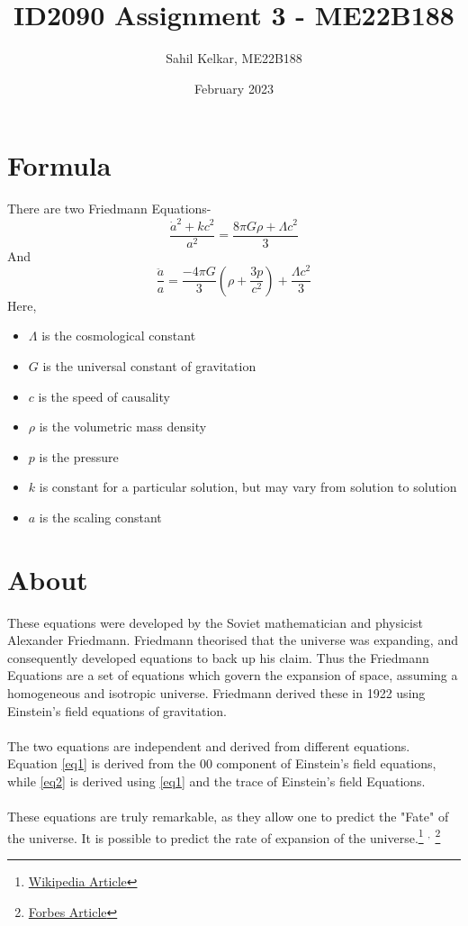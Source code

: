 \documentclass{article}
\title{ID2090 Assignment 3 - ME22B188}
\author{Sahil Kelkar, ME22B188}
\date{February 2023}
\begin{document}
\maketitle

\section{Formula}
There are two Friedmann Equations-
\begin{equation} 
\label{eq1}
\frac{\dot{a}^2 + k c^2}{a^2} = \frac{8 \pi G \rho + \Lambda c^2}{3}
\end{equation} 
And
\begin{equation}
\label{eq2}
\frac{\ddot{a}}{a} = \frac{-4 \pi G}{3} \left(\rho + \frac{3p} {c^2}\right) + \frac{\Lambda c^2}{3}
\end{equation}
Here,
\begin{itemize}
    \item $\Lambda$ is the cosmological constant
    \item $G$ is the universal constant of gravitation
    \item $c$ is the speed of causality
    \item $\rho$ is the volumetric mass density
    \item $p$ is the pressure
    \item $k$ is constant for a particular solution, but may vary from solution to solution
    \item $a$ is the scaling constant
\end{itemize}

\section{About}
These equations were developed by the Soviet mathematician and physicist Alexander Friedmann. Friedmann theorised that the universe was expanding, and consequently developed equations to back up his claim.
Thus the Friedmann Equations are a set of equations which govern the expansion of space, assuming a homogeneous and isotropic universe. Friedmann derived these in 1922 using Einstein's field equations of gravitation.
\paragraph{}
The two equations are independent and derived from different equations.
Equation \ref{eq1} is derived from the 00 component of Einstein's field equations, while \ref{eq2} is derived using \ref{eq1} and the trace of Einstein's field Equations.
\paragraph{}
These equations are truly remarkable, as they allow one to predict the "Fate" of the universe. It is possible to predict the rate of expansion of the universe.\footnote{\href {https://en.wikipedia.org/wiki/Friedmann_equations}{Wikipedia Article}}
$^{,}$
\footnote{\href {https://www.forbes.com/sites/startswithabang/2018/04/17/the-most-important-equation-in-the-universe/}{Forbes Article}}
\end{document}
